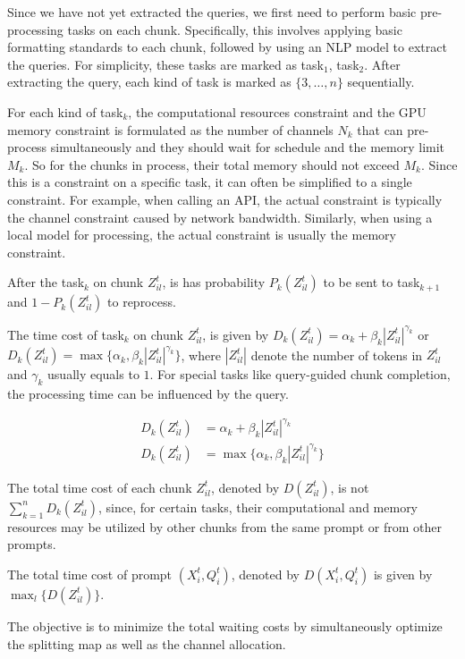 \documentclass[opre, nonblindrev]{informs3} %
\begin{document}
Since we have not yet extracted the queries, we first need to perform basic pre-processing tasks on each chunk. Specifically, this involves applying basic formatting standards to each chunk, followed by using an NLP model to extract the queries. For simplicity, these tasks are marked as task$_1$, task$_2$. After extracting the query, each kind of task is marked as $\{3,\dots,n\}$ sequentially.

For each kind of task$_k$, the computational resources constraint and the GPU memory constraint is formulated as the number of channels $N_k$ that can pre-process simultaneously and they should wait for schedule and the memory limit $M_k$. So for the chunks in process, their total memory should not exceed $M_k$. Since this is a constraint on a specific task, it can often be simplified to a single constraint. For example, when calling an API, the actual constraint is typically the channel constraint caused by network bandwidth. Similarly, when using a local model for processing, the actual constraint is usually the memory constraint.

After the task$_k$ on chunk $Z_{il}^t$, is has probability $P_k(Z_{il}^t)$ to be sent to task$_{k+1}$ and $1-P_k(Z_{il}^t)$ to reprocess.

The time cost of task$_k$ on chunk $Z_{il}^t$, is given by $D_k(Z_{il}^t)=\alpha_k+\beta_k|Z_{il}^t|^{\gamma_k}$ or $D_k(Z_{il}^t)=\max\{\alpha_k,\beta_k|Z_{il}^t|^{\gamma_k}\}$, where $|Z_{il}^t|$ denote the number of tokens in $Z_{il}^t$ and $\gamma_k$ usually equals to $1$. For special tasks like query-guided chunk completion, the processing time can be influenced by the query.

\begin{align*}
D_k(Z_{il}^t)&=\alpha_k+\beta_k|Z_{il}^t|^{\gamma_k}\\
    D_k(Z_{il}^t)&=\max\{\alpha_k,\beta_k|Z_{il}^t|^{\gamma_k}\}
\end{align*}

The total time cost of each chunk $Z_{il}^{t}$, denoted by $D(Z_{il}^t)$, is not $\sum_{k=1}^n D_k(Z_{il}^t)$, since, for certain tasks, their computational and memory resources may be utilized by other chunks from the same prompt or from other prompts. 

The total time cost of prompt $(X_i^t, Q_i^t)$, denoted by $D(X_i^t, Q_i^t)$ is given by $\max_{l}\{D(Z_{il}^t)\}$.

The objective is to minimize the total waiting costs by simultaneously optimize the splitting map as well as the channel allocation.

  


\newpage 
\setcounter{page}{1}
\begin{APPENDICES}
\small
\fontsize{9}{10}
\clearpage
 
% 
% 
\end{APPENDICES}
\end{document}
